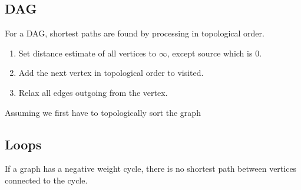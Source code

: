 \subsection{DAG}
For a DAG, shortest paths are found by processing in topological order.
\begin{enumerate}
    \item Set distance estimate of all vertices to $\infty$, except source which is 0.
    \item Add the next vertex in topological order to visited.
    \item Relax all edges outgoing from the vertex.
\end{enumerate}

Assuming we first have to topologically sort the graph 

\subsection{Loops}
If a graph has a negative weight cycle, there is no shortest path between vertices connected to the cycle.